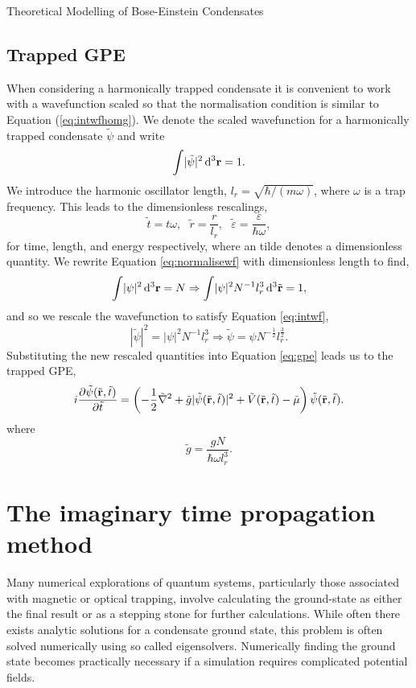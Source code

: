 \begin{chapter}{\label{cha:theoretical_model}Theoretical Modelling of Bose-Einstein Condensates}
	\subsection{\label{section:gpedimlesstrap} Trapped GPE}
		When considering a harmonically trapped condensate it is convenient to work with a wavefunction scaled so that the normalisation condition is similar to Equation (\ref{eq:intwfhomg}). We denote the scaled wavefunction for a harmonically trapped condensate $\tilde{\psi}$ and write
		\begin{equation}\label{eq:intwf}
			\int \! |\tilde{\psi}|^2 \, \mathrm{d}^3{\bf r} = 1.
		\end{equation}
		We introduce the harmonic oscillator length, $l_r = \sqrt{\hbar/(m\omega)}$, where $\omega$ is a trap frequency. This leads to the dimensionless rescalings,
		\begin{equation}
			\tilde{t} = t\omega, ~~~ \tilde{r} = \frac{r}{l_r}, ~~~ \tilde{\varepsilon}= \frac{\varepsilon}{\hbar\omega},
		\end{equation}
		for time, length, and energy respectively, where an tilde denotes a dimensionless quantity.
		We rewrite Equation \ref{eq:normalisewf} with dimensionless length to find,
		\begin{equation}
			\int \! |\psi|^2 \, \mathrm{d}^3{\bf r} = N \Rightarrow \int \! |\psi|^2 N^{-1} l_r^3 \, \mathrm{d}^3\tilde{\bf r} = 1,
		\end{equation}
		and so we rescale the wavefunction to satisfy Equation \ref{eq:intwf},
		\begin{equation}
			 |\tilde{\psi}|^2 = |\psi|^2 N^{-1} l_r^3 \Rightarrow \tilde{\psi} = \psi N^{-\frac{1}{2}} l_r^\frac{3}{2}.
		\end{equation}
	Substituting the new rescaled quantities into Equation \ref{eq:gpe} leads us to the trapped GPE,
	\begin{equation}\label{eq:dimgpetrapped}
		i\frac{\partial\tilde{\psi}({\tilde{\bf r}},\tilde{t})}{\partial {\tilde{t}}} = \left( -\frac{1}{2}\tilde{\nabla}^2 + \tilde{g}|\tilde{\psi}({\tilde{\bf r}},\tilde{t})|^2 + \tilde{V}({\tilde{\bf r}},\tilde{t}) - \tilde{\mu} \right) \tilde{\psi}({\tilde{\bf r}},\tilde{t}).
	\end{equation}
	where
	\begin{equation}
		 \tilde{g} = \frac{gN}{\hbar \omega l_r^3}.
	\end{equation}
\section{\label{section:imagTime} The imaginary time propagation method}
Many numerical explorations of quantum systems, particularly those associated with magnetic or optical trapping,  involve calculating the ground-state as either the final result or as a stepping stone for further calculations. While often there exists analytic solutions for a condensate ground state, this problem is often solved numerically using so called eigensolvers. Numerically finding the ground state becomes practically necessary if a simulation requires complicated potential fields.


\end{chapter}
